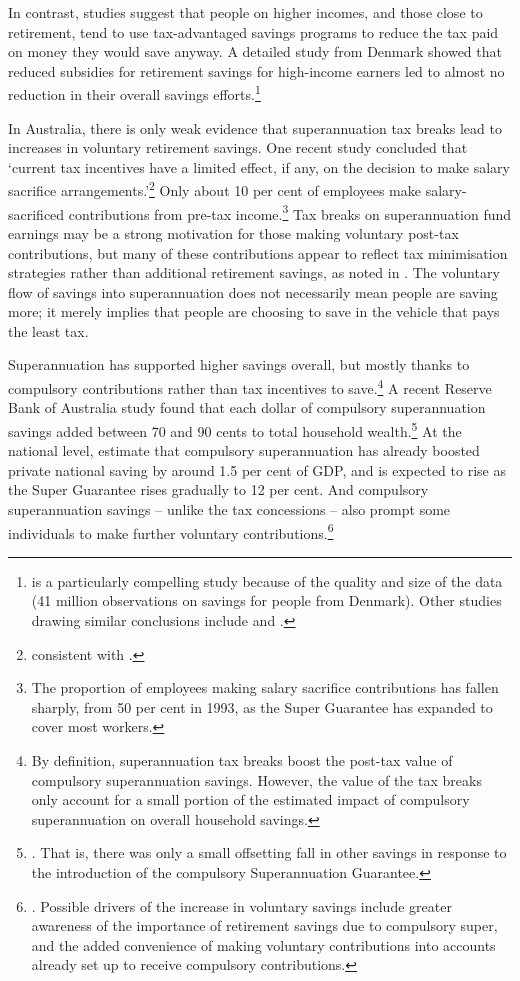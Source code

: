 In contrast, studies suggest that people on higher incomes, and those close to retirement, \textcite{AyusoJimenoVillanueva2007} tend to use tax-advantaged savings programs to reduce the tax paid on money they would save anyway. A detailed study from Denmark showed that reduced subsidies for retirement savings for high-income earners led to almost no reduction in their overall savings efforts.\footnote{\textcite{ChettyFriedmanLethPetersenEtAl2014} is a particularly compelling study because of the quality and size of the data (41 million observations on savings for people from Denmark). Other studies drawing similar conclusions include \textcite{EngenGale2000} and \textcite{Benjamin2003}.}

In Australia, there is only weak evidence that superannuation tax breaks lead to increases in voluntary retirement savings. One recent study concluded that ‘current tax incentives have a limited effect, if any, on the decision to make salary sacrifice arrangements.’\footnote{\textcite{Feng2014} consistent with .}
Only about 10 per cent of employees make salary-sacrificed contributions from pre-tax income.\footnote{\textcite{ABS2013t} The proportion of employees making salary sacrifice contributions has fallen sharply, from 50 per cent in 1993, as the Super Guarantee has expanded to cover most workers.}
Tax breaks on superannuation fund earnings may be a strong motivation for those making voluntary post-tax contributions, but many of these contributions appear to reflect tax minimisation strategies rather than additional retirement savings, as noted in . The voluntary flow of savings into superannuation does not necessarily mean people are saving more; it merely implies that people are choosing to save in the vehicle that pays the least tax. 

Superannuation has supported higher savings overall, but mostly thanks to compulsory contributions rather than tax incentives to save.\footnote{By definition, superannuation tax breaks boost the post-tax value of compulsory superannuation savings. However, the value of the tax breaks only account for a small portion of the estimated impact of compulsory superannuation on overall household savings.} 
A recent Reserve Bank of Australia study found that each dollar of compulsory superannuation savings added between 70 and 90 cents to total household wealth.\footnote{\textcite{Connolly2007}. That is, there was only a small offsetting fall in other savings in response to the introduction of the compulsory Superannuation Guarantee.} 
At the national level, \textcite{GruenSoding2011} estimate that compulsory superannuation has already boosted private national saving by around 1.5 per cent of GDP, and is expected to rise as the Super Guarantee rises gradually to 12 per cent. And compulsory superannuation savings – unlike the tax concessions – also prompt some individuals to make further voluntary contributions.\footnote{\textcite[][4]{Connolly2007}. Possible drivers of the increase in voluntary savings include greater awareness of the importance of retirement savings due to compulsory super, and the added convenience of making voluntary contributions into accounts already set up to receive compulsory contributions.}

